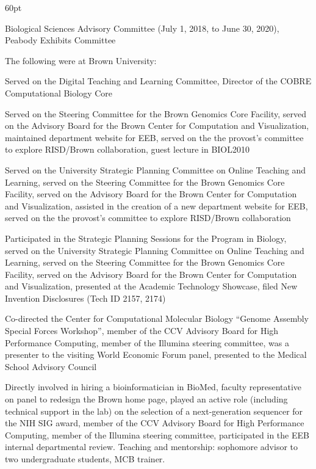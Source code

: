 \begin{entry}{60pt}
\item [\rm 2018] Biological Sciences Advisory Committee (July 1, 2018, to June 30, 2020), Peabody Exhibits Committee

The following were at Brown University:

\item [\rm 2016] Served on the Digital Teaching and Learning Committee, Director of the COBRE Computational Biology Core

\item [\rm 2014] Served on the Steering Committee for the Brown Genomics Core Facility, served on the Advisory Board for the Brown Center for Computation and Visualization, maintained department website for EEB, served on the the provost's committee to explore RISD/Brown collaboration, guest lecture in BIOL2010

\item [\rm 2013] Served on the University Strategic Planning Committee on Online Teaching and Learning, served on the Steering Committee for the Brown Genomics Core Facility, served on the Advisory Board for the Brown Center for Computation and Visualization, assisted in the creation of a new department website for EEB, served on the the provost's committee to explore RISD/Brown collaboration

\item [\rm 2012] Participated in the Strategic Planning Sessions for the Program in Biology, served on the University Strategic Planning Committee on Online Teaching and Learning, served on the Steering Committee for the Brown Genomics Core Facility, served on the Advisory Board for the Brown Center for Computation and Visualization, presented at the Academic Technology Showcase, filed New Invention Disclosures (Tech ID 2157, 2174)

\item [\rm 2011] Co-directed the Center for Computational Molecular Biology ``Genome Assembly Special Forces Workshop'', member of the CCV Advisory Board for High Performance Computing, member of the Illumina steering committee, was a presenter to the visiting World Economic Forum panel, presented to the Medical School Advisory Council

\item [\rm 2010] Directly involved in hiring a bioinformatician in BioMed, faculty representative on panel to redesign the Brown home page, played an active role (including technical support in the lab) on the selection of a next-generation sequencer for the NIH SIG award, member of the CCV Advisory Board for High Performance Computing, member of the Illumina steering committee, participated in the EEB internal departmental review. Teaching and mentorship: sophomore advisor to two undergraduate students, MCB trainer.


\end{entry}
